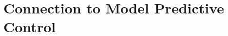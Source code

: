 \section{Connection to Model Predictive Control}
\label{sec:predictor_mpc_connection}

%
%



%
%
%




